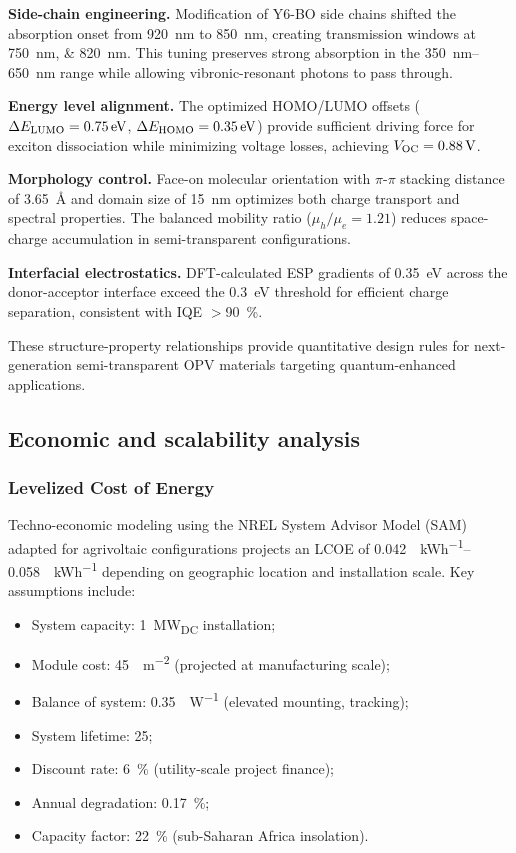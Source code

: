 \textbf{Side-chain engineering.} Modification of Y6-BO side chains shifted the absorption onset from \SI{920}{\nano\meter} to \SI{850}{\nano\meter}, creating transmission windows at \SIlist{750;820}{\nano\meter}. This tuning preserves strong absorption in the \SIrange{350}{650}{\nano\meter} range while allowing vibronic-resonant photons to pass through.

\textbf{Energy level alignment.} The optimized HOMO/LUMO offsets ($\Delta E_{\rm LUMO} = \SI{0.75}{\electronvolt}$, $\Delta E_{\rm HOMO} = \SI{0.35}{\electronvolt}$) provide sufficient driving force for exciton dissociation while minimizing voltage losses, achieving $V_{\rm OC} = \SI{0.88}{\volt}$.

\textbf{Morphology control.} Face-on molecular orientation with $\pi$-$\pi$ stacking distance of \SI{3.65}{\angstrom} and domain size of \SI{15}{\nano\meter} optimizes both charge transport and spectral properties. The balanced mobility ratio ($\mu_h/\mu_e = \num{1.21}$) reduces space-charge accumulation in semi-transparent configurations.

\textbf{Interfacial electrostatics.} DFT-calculated ESP gradients of \SI{0.35}{\electronvolt} across the donor-acceptor interface exceed the \SI{0.3}{\electronvolt} threshold for efficient charge separation, consistent with IQE $>$\SI{90}{\percent}.

These structure-property relationships provide quantitative design rules for next-generation semi-transparent OPV materials targeting quantum-enhanced applications.

\subsection{Economic and scalability analysis}\label{subsec:Economic_Analysis}

\subsubsection{Levelized Cost of Energy}

Techno-economic modeling using the NREL System Advisor Model (SAM) adapted for agrivoltaic configurations projects an LCOE of \SIrange{0.042}{0.058}{\USD\per\kWh} depending on geographic location and installation scale. Key assumptions include:
\begin{itemize}
    \item System capacity: \SI{1}{\mega\watt_{DC}} installation;
    \item Module cost: \SI{45}{\USD\per\meter\squared} (projected at manufacturing scale);
    \item Balance of system: \SI{0.35}{\USD\per\watt} (elevated mounting, tracking);
    \item System lifetime: \SI{25}{\yr};
    \item Discount rate: \SI{6}{\percent} (utility-scale project finance);
    \item Annual degradation: \SI{0.17}{\percent};
    \item Capacity factor: \SI{22}{\percent} (sub-Saharan Africa insolation).
\end{itemize}

